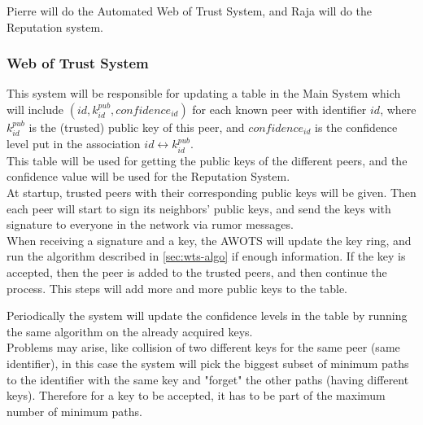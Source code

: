 \documentclass[]{article}
\begin{document}
\noindent
Pierre will do the Automated Web of Trust System, and Raja will do the Reputation system.

\subsubsection{Web of Trust System}
This system will be responsible for updating a table in the Main System which will include $(id, k^{pub}_{id}, confidence_{id})$ for each known peer with identifier $id$, where $k^{pub}_{id}$ is the (trusted) public key of this peer, and $confidence_{id}$ is the confidence level put in the association $id \leftrightarrow k^{pub}_{id}$. \\
This table will be used for getting the public keys of the different peers, and the confidence value will be used for the Reputation System. \\

At startup, trusted peers with their corresponding public keys will be given. Then each peer will start to sign its neighbors' public keys, and send the keys with signature to everyone in the network via rumor messages. \\
When receiving a signature and a key, the AWOTS will update the key ring, and run the algorithm described in \ref{sec:wts-algo} if enough information. If the key is accepted, then the peer is added to the trusted peers, and then continue the process.
This steps will add more and more public keys to the table. 

Periodically the system will update the confidence levels in the table by running the same algorithm on the already acquired keys. \\

Problems may arise, like collision of two different keys for the same peer (same identifier), in this case the system will pick the biggest subset of minimum paths to the identifier with the same key and "forget" the other paths (having different keys). Therefore for a key to be accepted, it has to be part of the maximum number of minimum paths.
\end{document}
